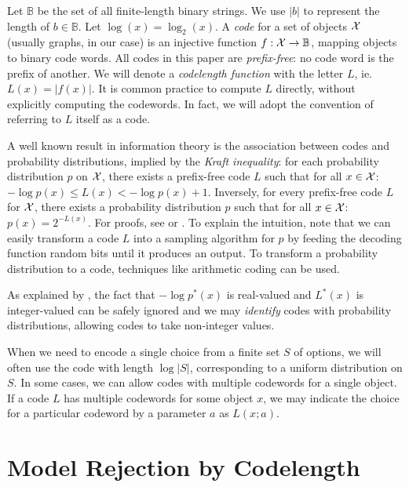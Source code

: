 \documentclass[twoside,11pt]{article}
\newcommand{\B}{{\mathbb B}}
\begin{document}
Let $\B$ be the set of all finite-length binary strings. We use $|b|$ to represent the length of $b \in \B$. Let $\log(x) = \log_2(x)$. A \emph{code} for a set of objects $\cal X$ (usually graphs, in our case) is an injective function $f: {\cal X} \to \B$, mapping objects to binary code words. All codes in this paper are \emph{prefix-free}: no code word is the prefix of another. We will denote a \emph{codelength function} with the letter $L$, ie. $L(x) = |f(x)|$. It is common practice to compute $L$ directly, without explicitly computing the codewords. In fact, we will adopt the convention of referring to $L$ itself as a code.

A well known result in information theory is the association between codes and probability distributions, implied by the  \emph{Kraft inequality}: for each probability distribution $p$ on $\cal X$, there exists a prefix-free code $L$ such that for all $x \in \cal X$: $- \log p(x) \leq L(x) < -\log p(x) + 1$. Inversely, for every prefix-free code $L$ for $\cal X$, there exists a probability distribution $p$ such that for all $x \in \cal X$: $p(x) = 2^{-L(x)}$. For proofs, see \cite[Section~3.2.1]{grunwald2007minimum} or \cite[Theorem~5.2.1]{cover2006elements}. To explain the intuition, note that we can easily transform a code $L$ into a sampling algorithm for $p$ by feeding the decoding function random bits until it produces an output. To transform a probability distribution to a code, techniques like arithmetic coding \citep{rissanen1979arithmetic} can be used. 

As explained by \citet[page 96]{grunwald2007minimum}, the fact that $-\log p^*(x)$ is real-valued and $L^*(x)$ is integer-valued can be safely ignored and we may \emph{identify} codes with probability distributions, allowing codes to take non-integer values. 

When we need to encode a single choice from a finite set $S$ of options, we will often use the code with length $\log |S|$, corresponding to a uniform distribution on $S$. In some cases, we can allow codes with multiple codewords for a single object. If a code $L$ has multiple codewords for some object  $x$, we may indicate the choice for a particular codeword by a parameter $a$ as $L(x; a)$.

\section{Model Rejection by Codelength}

\label{section:model-selection}
\end{document}
